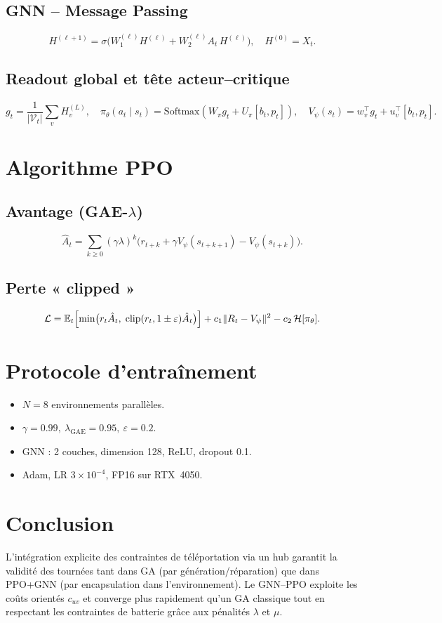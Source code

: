 \documentclass[11pt,a4paper]{article}
\newcommand{\E}{\mathbb{E}}
\begin{document}
\subsection{GNN – Message Passing}
\[
  H^{(\ell+1)} 
  = \sigma\bigl(W_1^{(\ell)}H^{(\ell)} + W_2^{(\ell)}A_t\,H^{(\ell)}\bigr),
  \quad 
  H^{(0)}=X_t.
\]

\subsection{Readout global et tête acteur–critique}
\[
  g_t = \frac1{|\mathcal V_t|}\sum_v H_v^{(L)},
\quad
\pi_\theta(a_t\mid s_t)=\mathrm{Softmax}(W_\pi g_t + U_\pi[b_t,p_t]),
\quad
V_\psi(s_t)=w_v^\top g_t + u_v^\top[b_t,p_t].
\]

\section{Algorithme PPO}
\subsection{Avantage (GAE-\texorpdfstring{\(\lambda\)}{\lambda})}
\[
  \hat A_t 
  = \sum_{k\ge0}(\gamma\lambda)^k\bigl(r_{t+k}+\gamma V_\psi(s_{t+k+1})-V_\psi(s_{t+k})\bigr).
\]

\subsection{Perte « clipped »}
\[
  \mathcal L
  = \E_t\Bigl[\min\bigl(r_t\hat A_t,\;\mathrm{clip}(r_t,1\pm\varepsilon)\hat A_t\bigr)\Bigr]
    +c_1\|R_t-V_\psi\|^2 - c_2\,\mathcal H[\pi_\theta].
\]

\section{Protocole d'entraînement}
\begin{itemize}
  \item \(N=8\) environnements parallèles.
  \item \(\gamma=0.99,\ \lambda_{\text{GAE}}=0.95,\ \varepsilon=0.2\).
  \item GNN : 2 couches, dimension 128, ReLU, dropout 0.1.
  \item Adam, LR \(3\times10^{-4}\), FP16 sur RTX~4050.
\end{itemize}

\section{Conclusion}
L’intégration explicite des contraintes de téléportation via un hub garantit la validité des tournées tant dans GA (par génération/réparation) que dans PPO+GNN (par encapsulation dans l’environnement). Le GNN–PPO exploite les coûts orientés \(c_{uv}\) et converge plus rapidement qu’un GA classique tout en respectant les contraintes de batterie grâce aux pénalités \(\lambda\) et \(\mu\).
\end{document}
